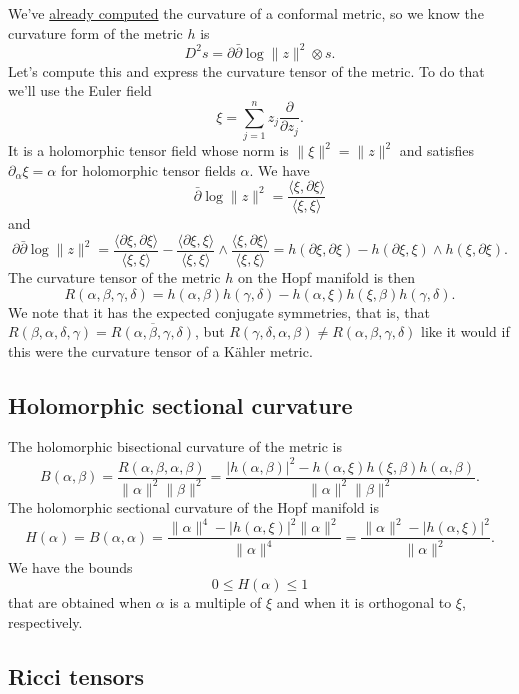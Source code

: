 \documentclass[10pt,a4paper]{article}
\begin{document}
We've \hyperref[sec:org65fcbad]{already computed} the curvature of a conformal metric, so we know the curvature form of the metric $h$ is
$$
D^2 s = \partial\bar\partial \log \|z\|^2 \otimes s.
$$
Let's compute this and express the curvature tensor of the metric. To do that we'll use the Euler field
$$
\xi = \sum_{j=1}^n z_j \frac{\partial}{\partial z_j}.
$$
It is a holomorphic tensor field whose norm is $\|\xi\|^2 = \|z\|^2$ and satisfies $\partial_\alpha \xi = \alpha$ for holomorphic tensor fields $\alpha$. We have
$$
\bar\partial \log \|z\|^2
= \frac{\langle \xi, \partial\xi \rangle}{\langle \xi,\xi \rangle}
$$
and
$$
\partial\bar\partial \log \|z\|^2
= \frac{\langle \partial \xi, \partial \xi \rangle}{\langle \xi, \xi \rangle}
- \frac{\langle \partial\xi, \xi\rangle}{\langle \xi, \xi \rangle} \wedge \frac{\langle \xi, \partial \xi \rangle}{\langle \xi, \xi \rangle}
= h(\partial\xi, \partial\xi) - h(\partial\xi, \xi) \wedge h(\xi, \partial\xi).
$$
The curvature tensor of the metric \(h\) on the Hopf manifold is then
$$
R(\alpha,\beta,\gamma,\delta)
= h(\alpha, \beta) h(\gamma, \delta)
- h(\alpha, \xi) h(\xi, \beta) h(\gamma, \delta).
$$
We note that it has the expected conjugate symmetries, that is, that \(R(\beta, \alpha, \delta, \gamma) = \overline{R(\alpha, \beta, \gamma, \delta)}\), but \(R(\gamma, \delta, \alpha, \beta) \not= R(\alpha, \beta, \gamma, \delta)\) like it would if this were the curvature tensor of a K\"ahler metric.


\subsection{Holomorphic sectional curvature}
\label{sec:org6471503}

The holomorphic bisectional curvature of the metric is
$$
B(\alpha,\beta)
= \frac{R(\alpha,\beta,\alpha,\beta)}{\|\alpha\|^2\|\beta\|^2}
= \frac{|h(\alpha,\beta)|^2 - h(\alpha,\xi)h(\xi,\beta)h(\alpha,\beta)}{\|\alpha\|^2\|\beta\|^2}.
$$
The holomorphic sectional curvature of the Hopf manifold is
$$
H(\alpha)
= B(\alpha,\alpha)
= \frac{\|\alpha\|^4 - |h(\alpha,\xi)|^2 \|\alpha\|^2}{\|\alpha\|^4}
= \frac{\|\alpha\|^2 - |h(\alpha,\xi)|^2}{\|\alpha\|^2}.
$$
We have the bounds
$$
0 \leq H(\alpha) \leq 1
$$
that are obtained when $\alpha$ is a multiple of $\xi$ and when it is orthogonal to $\xi$, respectively.

\subsection{Ricci tensors}
\label{sec:org3942125}
\end{document}
